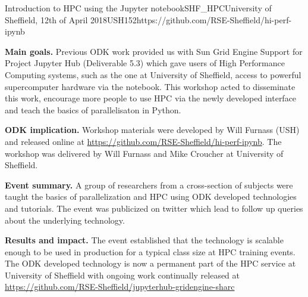 \begin{event}{Introduction to HPC using the Jupyter notebook}{SHF_HPC}{University of Sheffield, 12th of April 2018}{USH}{15}{2}{https://github.com/RSE-Sheffield/hi-perf-ipynb}

\textbf{Main goals.} Previous ODK work provided us with Sun Grid Engine Support for Project Jupyter Hub (Deliverable 5.3) which gave users of High Performance Computing systems, such as the one at University of Sheffield, access to powerful supercomputer hardware via the notebook. This workshop acted to disseminate this work, encourage more people to use HPC via the newly developed interface and teach the basics of parallelisaton in Python.

\textbf{ODK implication.} Workshop materials were developed by Will Furnass (USH) and released online at \url{https://github.com/RSE-Sheffield/hi-perf-ipynb}. The workshop was delivered by Will Furnass and Mike Croucher at University of Sheffield.

\textbf{Event summary.} A group of researchers from a cross-section of subjects were taught the basics of parallelization and HPC using ODK developed technologies and tutorials. The event was publicized on twitter which lead to follow up queries about the underlying technology. 

\textbf{Results and impact.} The event established that the technology is scalable enough to be used in production for a typical class size at HPC training events. The ODK developed technology is now a permanent part of the HPC service at University of Sheffield with ongoing work continually released at \url{https://github.com/RSE-Sheffield/jupyterhub-gridengine-sharc}

\end{event}
